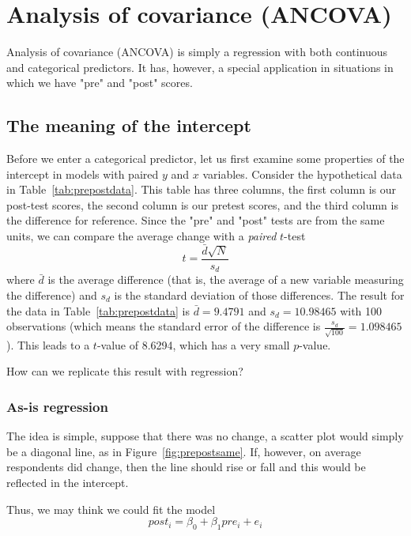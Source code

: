

\chapter{Analysis of covariance (ANCOVA)}

Analysis of covariance (ANCOVA) is simply a regression with both continuous and categorical predictors. It has, however, a special application in situations in which we have "pre" and "post" scores.

\section{The meaning of the intercept}

Before we enter a categorical predictor, let us first examine some properties of the intercept in models with paired $y$ and $x$ variables. Consider the hypothetical data in Table~\ref{tab:prepostdata}. This table has three columns, the first column is our post-test scores, the second column is our pretest scores, and the third column is the difference for reference. Since the "pre" and "post" tests are from the same units, we can compare the average change with a {\it paired} $t$-test
\begin{equation}
t=\frac{\bar{d}\sqrt{N}}{s_{d}}
\end{equation}
where $\bar{d}$ is the average difference (that is, the average of a new variable measuring the difference) and $s_{d}$ is the standard deviation of those differences. The result for the data in Table~\ref{tab:prepostdata} is $\bar{d}=9.4791$ and $s_{d} = 10.98465$ with 100 observations (which means the standard error of the difference is $\frac{s_{d}}{\sqrt{100}}=1.098465$). This leads to a $t$-value of 8.6294, which has a very small $p$-value.

How can we replicate this result with regression?

\subsection{As-is regression}

The idea is simple, suppose that there was no change, a scatter plot would simply be a diagonal line, as in Figure~\ref{fig:prepostsame}. If, however, on average respondents did change, then the line should rise or fall and this would be reflected in the intercept.

Thus, we may think we could fit the model
\begin{equation}
post_i = \beta_0 + \beta_1 pre_i + e_i
\end{equation}

